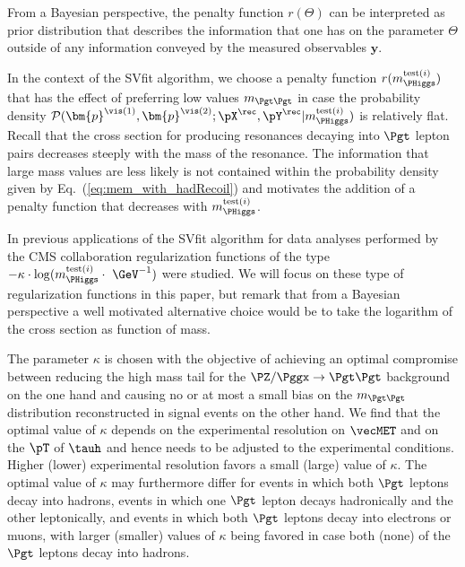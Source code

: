 From a Bayesian perspective, the penalty function $r(\Theta)$ can be interpreted as prior distribution that describes the information that one has on the parameter $\Theta$
outside of any information conveyed by the measured observables $\bm{y}$.

In the context of the SVfit algorithm, we choose a penalty function $r(m_{\PHiggs}^{\textrm{test}(i)})$
that has the effect of preferring low values $m_{\Pgt\Pgt}$ 
in case the probability density $\mathcal{P}(\bm{p}^{\vis(1)},\bm{p}^{\vis(2)};\pX^{\rec},\pY^{\rec}|m_{\PHiggs}^{\textrm{test}(i)})$ 
is relatively flat.
Recall that the cross section for producing resonances decaying into $\Pgt$ lepton pairs decreases steeply with the mass of the resonance.
The information that large mass values are less likely is not contained within the probability density given by Eq.~(\ref{eq:mem_with_hadRecoil})
and motivates the addition of a penalty function that decreases with $m_{\PHiggs}^{\textrm{test}(i)}$.

In previous applications of the SVfit algorithm for data analyses performed by the CMS collaboration regularization functions of the type 
$-\kappa \cdot \log(m_{\PHiggs}^{\textrm{test}(i)} \cdot \mbox{~\GeV}^{-1})$ were studied.
We will focus on these type of regularization functions in this paper,
but remark that from a Bayesian perspective a well motivated alternative choice would be to take the logarithm of the cross section as function of mass.

The parameter $\kappa$ is chosen with the objective of achieving an
optimal compromise between reducing the high mass tail for the
$\PZ/\Pggx \to \Pgt\Pgt$ background on the one hand and 
causing no or at most a small bias on the $m_{\Pgt\Pgt}$ distribution
reconstructed in signal events on the other hand.
We find that the optimal value of $\kappa$ depends on the experimental
resolution on $\vecMET$ and on the $\pT$ of $\tauh$ and hence needs to be adjusted to the experimental conditions.
Higher (lower) experimental resolution favors a small (large) value of $\kappa$. 
The optimal value of $\kappa$ may furthermore differ 
for events in which both $\Pgt$ leptons decay into hadrons,
events in which one $\Pgt$ lepton decays hadronically and the other leptonically,
and events in which both $\Pgt$ leptons decay into electrons or muons,
with larger (smaller) values of $\kappa$ being favored in case both (none) of the $\Pgt$ leptons decay into hadrons.

